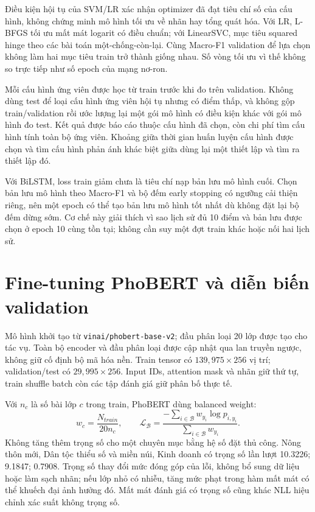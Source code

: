 Điều kiện hội tụ của SVM/LR xác nhận optimizer đã đạt tiêu chí số của cấu hình, không chứng minh mô hình tối ưu về nhãn hay tổng quát hóa. Với LR, L-BFGS tối ưu mất mát logarit có điều chuẩn; với LinearSVC, mục tiêu squared hinge theo các bài toán một-chống-còn-lại. Cùng Macro-F1 validation để lựa chọn không làm hai mục tiêu train trở thành giống nhau. Số vòng tối ưu vì thế không so trực tiếp như số epoch của mạng nơ-ron.

Mỗi cấu hình ứng viên được học từ train trước khi đo trên validation. Không dùng test để loại cấu hình ứng viên hội tụ nhưng có điểm thấp, và không gộp train/validation rồi ước lượng lại một gói mô hình có điều kiện khác với gói mô hình đo test. Kết quả được báo cáo thuộc cấu hình đã chọn, còn chi phí tìm cấu hình tính toàn bộ ứng viên. Khoảng giữa thời gian huấn luyện cấu hình được chọn và tìm cấu hình phản ánh khác biệt giữa dùng lại một thiết lập và tìm ra thiết lập đó.

Với BiLSTM, loss train giảm chưa là tiêu chí nạp bản lưu mô hình cuối. Chọn bản lưu mô hình theo Macro-F1 và bộ đếm early stopping có ngưỡng cải thiện riêng, nên một epoch có thể tạo bản lưu mô hình tốt nhất dù không đặt lại bộ đếm dừng sớm. Cơ chế này giải thích vì sao lịch sử đủ 10 điểm và bản lưu được chọn ở epoch 10 cùng tồn tại; không cần suy một đợt train khác hoặc nối hai lịch sử.

\FloatBarrier
\section{Fine-tuning PhoBERT và diễn biến validation}
Mô hình khởi tạo từ \texttt{vinai/phobert-base-v2}; đầu phân loại 20 lớp được tạo cho tác vụ. Toàn bộ encoder và đầu phân loại được cập nhật qua lan truyền ngược, không giữ cố định bộ mã hóa nền. Train tensor có $139{,}975\times256$ vị trí; validation/test có $29{,}995\times256$. Input IDs, attention mask và nhãn giữ thứ tự, train shuffle batch còn các tập đánh giá giữ phân bố thực tế.

Với $n_c$ là số bài lớp $c$ trong train, PhoBERT dùng balanced weight:
\begin{equation}w_c=\frac{N_{train}}{20n_c},\qquad
\mathcal L_{\mathcal B}=\frac{-\sum_{i\in\mathcal B}w_{y_i}\log p_{i,y_i}}{\sum_{i\in\mathcal B}w_{y_i}}.\end{equation}
Không tăng thêm trọng số cho một chuyên mục bằng hệ số đặt thủ công. Nông thôn mới, Dân tộc thiểu số và miền núi, Kinh doanh có trọng số lần lượt 10.3226; 9.1847; 0.7908. Trọng số thay đổi mức đóng góp của lỗi, không bổ sung dữ liệu hoặc làm sạch nhãn; nếu lớp nhỏ có nhiễu, tăng mức phạt trong hàm mất mát có thể khuếch đại ảnh hưởng đó. Mất mát đánh giá có trọng số cũng khác NLL hiệu chỉnh xác suất không trọng số.

